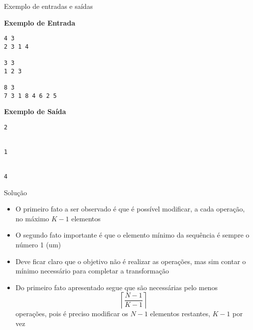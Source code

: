\begin{frame}[fragile]{Exemplo de entradas e saídas}

\begin{minipage}[t]{0.5\textwidth}
\textbf{Exemplo de Entrada}
\begin{verbatim}
4 3
2 3 1 4

3 3
1 2 3

8 3
7 3 1 8 4 6 2 5
\end{verbatim}
\end{minipage}
\begin{minipage}[t]{0.45\textwidth}
\textbf{Exemplo de Saída}
\begin{verbatim}
2


1


4
\end{verbatim}
\end{minipage}
\end{frame}

\begin{frame}[fragile]{Solução}

    \begin{itemize}
        \item O primeiro fato a ser observado é que é possível modificar, a cada operação, no
            máximo $K - 1$ elementos

        \item O segundo fato importante é que o elemento mínimo da sequência é sempre o número
            1 (um)

        \item Deve ficar claro que o objetivo não é realizar as operações, mas sim contar o
            mínimo necessário para completar a transformação

        \item Do primeiro fato apresentado segue que são necessárias pelo menos 
        \[
            \left\lceil \frac{N - 1}{K - 1} \right\rceil
        \] operações,  pois é preciso modificar os $N - 1$ elementos restantes, $K - 1$ por vez
    \end{itemize}

\end{frame}


